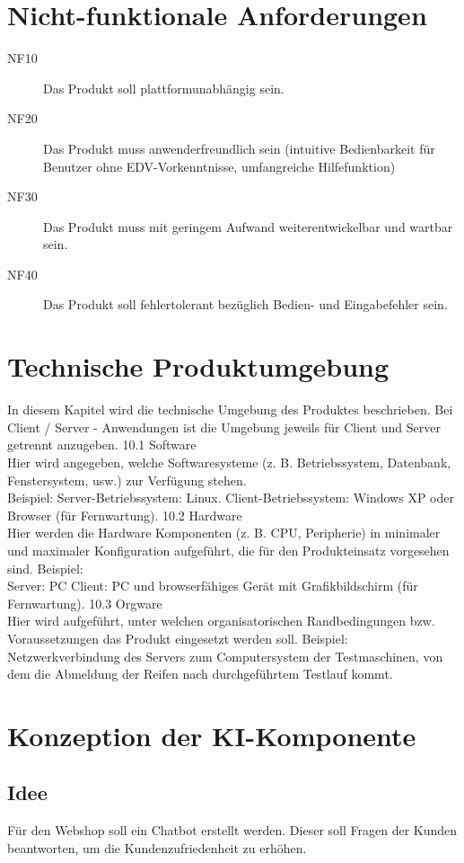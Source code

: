 \documentclass[%
	12pt,
	a4paper,
	oneside,
	parskip=full
]{scrbook}
\begin{document}
\chapter{Nicht-funktionale Anforderungen}
\begin{description}
	\item[NF10] Das Produkt soll plattformunabhängig sein.
	\item[NF20] Das Produkt muss anwenderfreundlich sein (intuitive Bedienbarkeit für Benutzer ohne EDV-Vorkenntnisse, umfangreiche Hilfefunktion)
	\item[NF30] Das Produkt muss mit geringem Aufwand weiterentwickelbar und wartbar sein.
	\item[NF40] Das Produkt soll fehlertolerant bezüglich Bedien- und Eingabefehler sein.
\end{description}

\chapter{Technische Produktumgebung}
In diesem Kapitel wird die technische Umgebung des Produktes beschrieben. Bei Client /
Server - Anwendungen ist die Umgebung jeweils für Client und Server getrennt anzugeben.
10.1 Software\\
Hier wird angegeben, welche Softwaresysteme (z. B. Betriebssystem, Datenbank,
Fenstersystem, usw.) zur Verfügung stehen.\\
Beispiel:
Server-Betriebssystem: Linux.
Client-Betriebssystem: Windows XP oder Browser (für Fernwartung).
10.2 Hardware \\
Hier werden die Hardware Komponenten (z. B. CPU, Peripherie) in minimaler und maximaler
Konfiguration aufgeführt, die für den Produkteinsatz vorgesehen sind.
Beispiel:\\
Server: PC
Client: PC und browserfähiges Gerät mit Grafikbildschirm (für Fernwartung).
10.3 Orgware\\
Hier wird aufgeführt, unter welchen organisatorischen Randbedingungen bzw.
Voraussetzungen das Produkt eingesetzt werden soll.
Beispiel:\\
Netzwerkverbindung des Servers zum Computersystem der Testmaschinen, von dem die
Abmeldung der Reifen nach durchgeführtem Testlauf kommt.

\chapter{Konzeption der KI-Komponente}
\section{Idee}
Für den Webshop soll ein Chatbot erstellt werden. 
Dieser soll Fragen der Kunden beantworten, um die Kundenzufriedenheit zu erhöhen.
\end{document}
